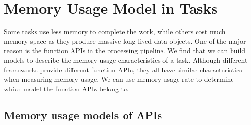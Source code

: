 \section{Memory Usage Model in Tasks}



Some tasks use less memory to complete the work, while others cost much memory space as they produce massive long lived data objects. One of the major reason is the function APIs in the processing pipeline. We find that we can build models to describe the memory usage characteristics of a task. Although different frameworks provide different function APIs, they all have similar characteristics when measuring memory usage. We can use memory usage rate to determine which model the function APIs belong to.


\subsection{Memory usage models of APIs}

